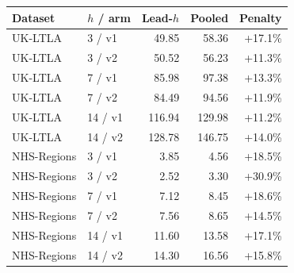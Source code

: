\begin{tabular}{llrrr}
\hline
Dataset & $h$ / arm & Lead-$h$ & Pooled & Penalty \\
\hline
UK-LTLA & 3 / v1 & 49.85 & 58.36 & +17.1\% \\
UK-LTLA & 3 / v2 & 50.52 & 56.23 & +11.3\% \\
UK-LTLA & 7 / v1 & 85.98 & 97.38 & +13.3\% \\
UK-LTLA & 7 / v2 & 84.49 & 94.56 & +11.9\% \\
UK-LTLA & 14 / v1 & 116.94 & 129.98 & +11.2\% \\
UK-LTLA & 14 / v2 & 128.78 & 146.75 & +14.0\% \\
NHS-Regions & 3 / v1 & 3.85 & 4.56 & +18.5\% \\
NHS-Regions & 3 / v2 & 2.52 & 3.30 & +30.9\% \\
NHS-Regions & 7 / v1 & 7.12 & 8.45 & +18.6\% \\
NHS-Regions & 7 / v2 & 7.56 & 8.65 & +14.5\% \\
NHS-Regions & 14 / v1 & 11.60 & 13.58 & +17.1\% \\
NHS-Regions & 14 / v2 & 14.30 & 16.56 & +15.8\% \\
\hline
\end{tabular}
